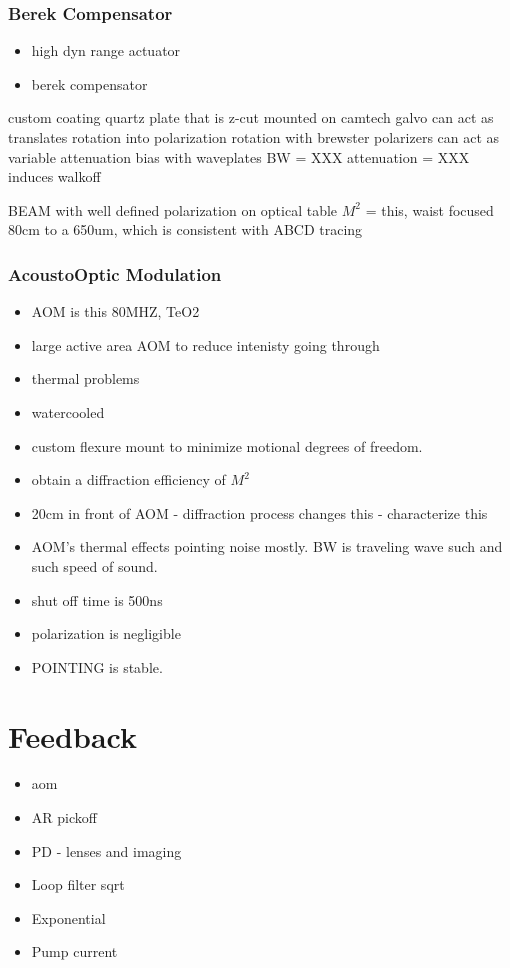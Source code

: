 \documentclass[twocolumn,aps,pra,showpacs,preprintnumbers,bibnotes]{revtex4-1}
\begin{document}
\subsubsection{Berek Compensator}
\begin{itemize}
\item high dyn range actuator
\item berek compensator
\end{itemize}

custom coating quartz plate that is z-cut mounted on camtech galvo
can act as translates rotation into polarization rotation
with brewster polarizers can act as variable attenuation
bias with waveplates
BW = XXX
attenuation = XXX
induces walkoff

BEAM with well defined polarization on optical table 
$M^2$ = this, waist focused 80cm to a 650um, which is consistent with ABCD tracing

\subsubsection{AcoustoOptic Modulation}

\begin{itemize}
    \item AOM is this 80MHZ, TeO2
    \item large active area AOM to reduce intenisty going through
    \item thermal problems
    \item watercooled
    \item custom flexure mount to minimize motional degrees of freedom.
    \item obtain a diffraction efficiency of $M^2$
    \item 20cm in front of AOM - diffraction process changes this - characterize this
    \item AOM's thermal effects pointing noise mostly. BW is traveling wave such and such speed of sound.
    \item shut off time is 500ns
    \item polarization is negligible
    \item POINTING is stable.
\end{itemize}

\section{Feedback}
\begin{itemize}
    \item aom
    \item AR pickoff
    \item PD - lenses and imaging
    \item Loop filter sqrt
    \item Exponential
    \item Pump current
\end{itemize}
\end{document}
